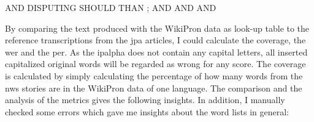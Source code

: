\begin{covexamples}
\item \label{ex:english-coverage-text}  AND  DISPUTING  SHOULD  THAN ; AND  AND  AND 
\end{covexamples}

By comparing the text produced with the WikiPron data as look-up table to the reference transcriptions from the \ac{jpa} articles, I could calculate the coverage, the \ac{wer} and the \ac{per}. As the \ac{ipalpha} does not contain any capital letters, all inserted capitalized original words will be regarded as wrong for any score. The coverage is calculated by simply calculating the percentage of how many words from the \ac{nws} stories are in the WikiPron data of one language. The comparison and the analysis of the metrics gives the following insights. In addition, I manually checked some errors which gave me insights about the word lists in general:

